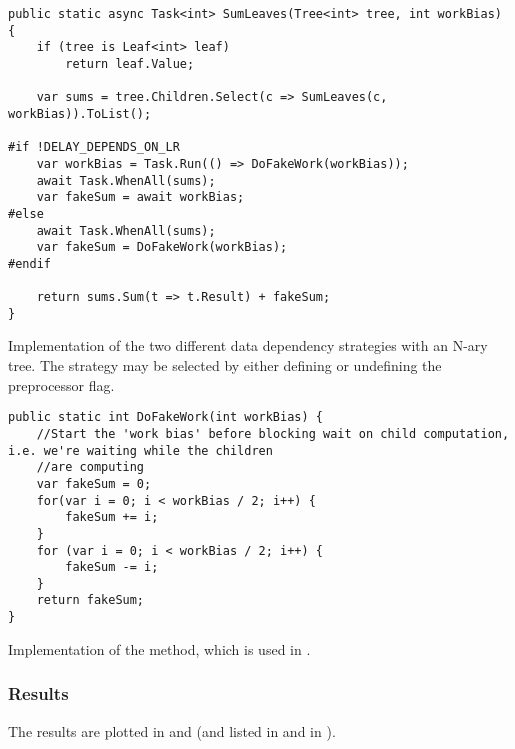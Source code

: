 \begin{listing}[H]
    \begin{verbatim}
public static async Task<int> SumLeaves(Tree<int> tree, int workBias)
{
    if (tree is Leaf<int> leaf)
        return leaf.Value;

    var sums = tree.Children.Select(c => SumLeaves(c, workBias)).ToList();

#if !DELAY_DEPENDS_ON_LR
    var workBias = Task.Run(() => DoFakeWork(workBias));
    await Task.WhenAll(sums);
    var fakeSum = await workBias;
#else
    await Task.WhenAll(sums);
    var fakeSum = DoFakeWork(workBias);
#endif

    return sums.Sum(t => t.Result) + fakeSum;
}
    \end{verbatim}
    \caption{Implementation of the two different data dependency strategies with an N-ary tree. The strategy may be selected by either defining or undefining the  preprocessor flag.}
    \label{lst:benchmark:strategies}
\end{listing}

\begin{listing}[H]
    \begin{verbatim}
public static int DoFakeWork(int workBias) {
    //Start the 'work bias' before blocking wait on child computation, i.e. we're waiting while the children
    //are computing
    var fakeSum = 0;
    for(var i = 0; i < workBias / 2; i++) {
        fakeSum += i;
    }
    for (var i = 0; i < workBias / 2; i++) {
        fakeSum -= i;
    }
    return fakeSum;
}
\end{verbatim}
\caption{Implementation of the  method, which is used in .}
\label{lst:benchmark:strategies-helper}
\end{listing}

\subsubsection{Results} \label{sec:crit-work-res}
The results are plotted in  and  (and listed in  and  in ).

